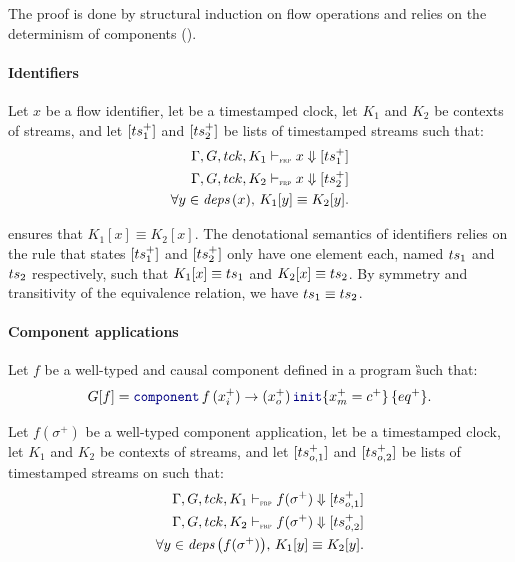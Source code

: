 \begin{skippableproof}
    The proof is done by structural induction on flow operations and relies on the determinism of
    \GRSync components ().

    \paragraph{Identifiers}
    Let $x$ be a flow identifier, let \tck be a timestamped clock, let $K_1$ and $K_2$ be contexts
    of streams, and let $[ts_1^+]$ and $[ts_2^+]$ be lists of timestamped streams such that:
    \begin{align*}
        \Gamma, G, tck, K_1 \vdash_{\textnormal{\tiny\textsc{frp}}} x \Downarrow [ts_1^+] \\
        \Gamma, G, tck, K_2 \vdash_{\textnormal{\tiny\textsc{frp}}} x \Downarrow [ts_2^+] \\
        \forall y \in {\ensuremath{\textit{deps}\left(x\right)}}, \, K_1[y] \equiv K_2[y].
    \end{align*}

     ensures that $K_1[x] \equiv K_2[x]$.
    The denotational semantics of identifiers relies on the rule  that states $[ts_1^+]$ and $[ts_2^+]$ only have one element each, named $ts_1$ and
    $ts_2$ respectively, such that $K_1[x] \equiv ts_1$ and $K_2[x] \equiv ts_2$. By symmetry and
    transitivity of the equivalence relation, we have $ts_1 \equiv ts_2$.

    \paragraph{Component applications}
    Let $f$ be a well-typed and causal component defined in a program \G such that:
    \begin{equation*}
        G[f] = \component{f}{x_i^+}{x_o^+}{eq^+}{x_m^+ = c^+}.
    \end{equation*}

    Let $f(\sigma^+)$ be a well-typed component application, let \tck be a timestamped clock, let
    $K_1$ and $K_2$ be contexts of streams, and let $[ts_{o, 1}^+]$ and $[ts_{o, 2}^+]$ be lists of
    timestamped streams on \tck such that:
    \begin{align*}
        \Gamma, G, tck, K_1 \vdash_{\textnormal{\tiny\textsc{frp}}} f(\sigma^+) \Downarrow [ts_{o, 1}^+] \\
        \Gamma, G, tck, K_2 \vdash_{\textnormal{\tiny\textsc{frp}}} f(\sigma^+) \Downarrow [ts_{o, 2}^+] \\
        \forall y \in {\ensuremath{\textit{deps}\left(f(\sigma^+)\right)}}, \, K_1[y] \equiv K_2[y].
    \end{align*}


\end{skippableproof}
